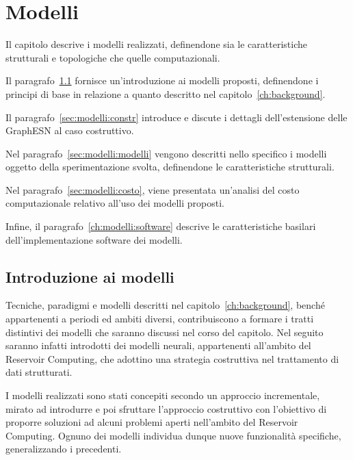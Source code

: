 \chapter{Modelli}\label{ch:modelli}
Il capitolo descrive i modelli realizzati, definendone sia le caratteristiche strutturali e topologiche che quelle computazionali.

Il paragrafo~\ref{sec:modelli:intro} fornisce un'introduzione ai modelli proposti, definendone i principi di base in relazione a quanto descritto nel capitolo~\ref{ch:background}.

Il paragrafo~\ref{sec:modelli:constr} introduce e discute i dettagli dell'estensione delle Graph\-ESN al caso costruttivo.

Nel paragrafo~\ref{sec:modelli:modelli} vengono descritti nello specifico i modelli oggetto della sperimentazione svolta, definendone le caratteristiche strutturali.

Nel paragrafo~\ref{sec:modelli:costo}, viene presentata un'analisi del costo computazionale relativo all'uso dei modelli proposti.

Infine, il paragrafo~\ref{ch:modelli:software} descrive le caratteristiche basilari dell'implementazione software dei modelli.


\section{Introduzione ai modelli}\label{sec:modelli:intro}
Tecniche, paradigmi e modelli descritti nel capitolo~\ref{ch:background}, benché appartenenti a periodi ed ambiti diversi, contribuiscono a formare i tratti distintivi dei modelli che saranno discussi nel corso del capitolo. Nel seguito saranno infatti introdotti dei modelli neurali, appartenenti all'ambito del Reservoir Computing, che adottino una strategia costruttiva nel trattamento di dati strutturati.

I modelli realizzati sono stati concepiti secondo un approccio incrementale, mirato ad introdurre e poi sfruttare l'approccio costruttivo con l'obiettivo di proporre soluzioni ad alcuni problemi aperti nell'ambito del Reservoir Computing. 
Ognuno dei modelli individua dunque nuove funzionalità specifiche, generalizzando i precedenti.

